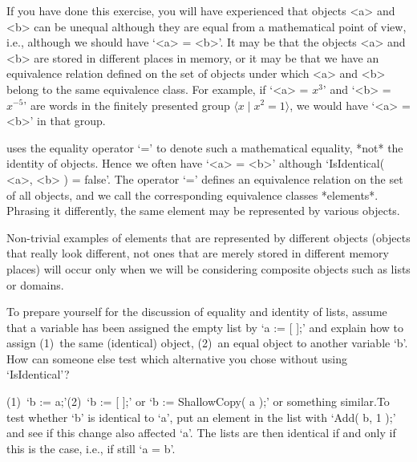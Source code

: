 If  you have done this  exercise, you  will  have experienced that {\GAP}
objects  <a>  and  <b> can  be  unequal  although they are   equal from a
mathematical point of view, i.e., although we should have `<a> = <b>'. It
may  be that the objects <a>  and <b> are  stored  in different places in
memory, or it may be that we have  an equivalence relation defined on the
set of  objects under which <a>  and <b> belong   to the same equivalence
class.  For example, if `<a>  = $x^3$' and  `<b> = $x^{-5}$' are words in
the finitely presented group $\langle  x\mid x^2=1\rangle$, we would have
`<a> = <b>' in that group.

{\GAP} uses  the   equality operator `=' to  denote   such a mathematical
equality, *not* the identity of objects. Hence we often  have `<a> = <b>'
although `IsIdentical(  <a>, <b> ) = false'.  The operator `=' defines an
equivalence relation on  the set of  all {\GAP} objects,  and we call the
corresponding equivalence classes *elements*.
Phrasing it differently, the  same element may be represented by various
{\GAP} objects.

Non-trivial examples of   elements   that are represented by    different
objects (objects  that really  look different,  not ones  that are merely
stored in  different  memory places)  will  occur only   when  we will be
considering composite objects such as lists or domains.

\exercise To prepare yourself for the discussion of equality and identity
of lists, assume  that a variable has been  assigned the empty list by `a
:=  [ ];' and   explain how to  assign  (1)~the same (identical)  object,
(2)~an equal  object to another variable  `b'. How can someone  else test
which alternative you chose without using `IsIdentical'?

\answer (1)~`b := a;'\quad (2)~`b := [ ];' or `b := ShallowCopy( a );' or
something similar.\quad  To test whether `b'  is identical to `a', put an
element  in the list with  `Add(  b, 1  );'  and see  if this change also
affected `a'.  The lists are then  identical if and only  if  this is the
case, i.e., if still `a = b'.


